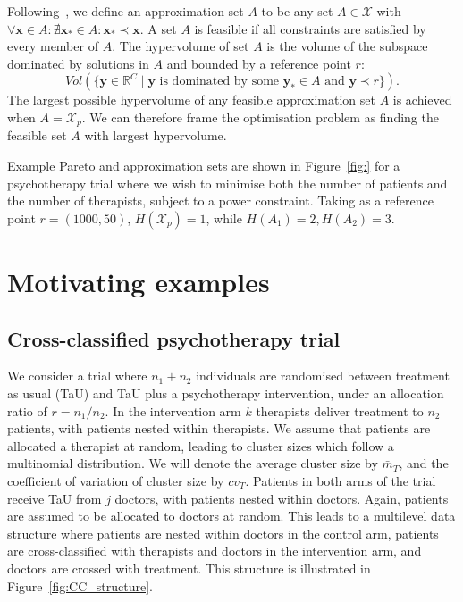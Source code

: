 \documentclass{article} %
\begin{document}
Following~\cite{Emmerich2011}, we define an approximation set $A$ to be any set $A \in \mathcal{X}$ with $\forall \mathbf{x} \in A : \nexists \mathbf{x}_{*} \in A : \mathbf{x}_{*} \prec \mathbf{x}$. A set $A$ is feasible if all constraints are satisfied by every member of $A$. The hypervolume of set $A$ is the volume of the subspace dominated by solutions in $A$ and bounded by a reference point $r$:
\begin{equation}
Vol(\{\mathbf{y} \in \mathbb{R}^{C} \mid \mathbf{y} \text{ is dominated by some } \mathbf{y}_{*} \in A \text{ and } \mathbf{y} \prec r \}). 
\end{equation}
The largest possible hypervolume of any feasible approximation set $A$ is achieved when $A = \mathcal{X}_{p}$. We can therefore frame the optimisation problem as finding the feasible set $A$ with largest hypervolume.

Example Pareto and approximation sets are shown in Figure~\ref{fig:} for a psychotherapy trial where we wish to minimise both the number of patients and the number of therapists, subject to a power constraint. Taking as a reference point $r = (1000, 50)$, $H(\mathcal{X}_{p}) = 1$, while $H(A_{1}) = 2, H(A_{2}) = 3$. 

\section{Motivating examples}\label{sec:examples}

\subsection{Cross-classified psychotherapy trial}\label{sec:CC}

We consider a trial where $n_{1} + n_{2}$ individuals are randomised between treatment as usual (TaU) and TaU plus a psychotherapy intervention, under an allocation ratio of $r = n_{1}/n_{2}$. In the intervention arm $k$ therapists deliver treatment to $n_{2}$ patients, with patients nested within therapists. We assume that patients are allocated a therapist at random, leading to cluster sizes which follow a multinomial distribution. We will denote the average cluster size by $\bar{m}_{T}$, and the coefficient of variation of cluster size by $cv_{T}$. Patients in both arms of the trial receive TaU from $j$ doctors, with patients nested within doctors. Again, patients are assumed to be allocated to doctors at random. This leads to a multilevel data structure where patients are nested within doctors in the control arm, patients are cross-classified with therapists and doctors in the intervention arm, and doctors are crossed with treatment. This structure is illustrated in Figure~\ref{fig:CC_structure}. 
\end{document}

